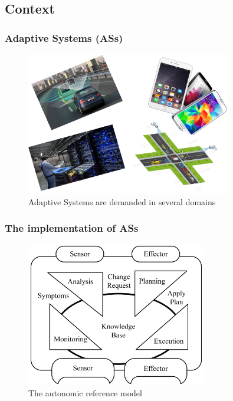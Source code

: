 \subsection{Context}
\begin{frame}\frametitle{Adaptive Systems (ASs)}

\begin{figure}
	\includegraphics[width=0.8\textwidth]{figures/sas.png}
	\caption{Adaptive Systems are demanded in several domains}
\end{figure}

\end{frame}

\begin{frame}\frametitle{The implementation of ASs}
\begin{figure}
	\includegraphics[width=0.7\textwidth]{figures/mapek.png}
	\caption{The autonomic reference model \cite{ibm2005architectural}}
\end{figure}

\end{frame}

